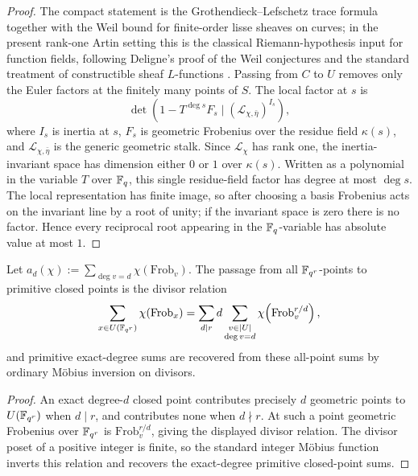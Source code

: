 \begin{proof}
The compact statement is the Grothendieck--Lefschetz trace formula together
with the Weil bound for finite-order lisse sheaves on curves; in the present
rank-one Artin setting this is the classical Riemann-hypothesis input for
function fields, following Deligne's proof of the Weil conjectures and the
standard treatment of constructible sheaf \(L\)-functions
\cite{DeligneSGA4half1977,Deligne1980WeilII,Milne1980Etale,Serre1981,Rosen2002}.
Passing from \(C\) to \(U\)
removes only the Euler factors at the finitely many points of \(S\).  The
local factor at \(s\) is
\[
\det\!\left(1-T^{\deg s}F_s\mid(\mathcal L_{\chi,\bar\eta})^{I_s}\right),
\]
where \(I_s\) is inertia at \(s\), \(F_s\) is geometric Frobenius over the
residue field \(\kappa(s)\), and \(\mathcal L_{\chi,\bar\eta}\) is the generic
geometric stalk.  Since \(\mathcal L_\chi\) has rank one, the
inertia-invariant space has dimension either \(0\) or \(1\) over
\(\kappa(s)\).  Written as a polynomial in the variable \(T\) over \(\mathbb{F}_q\),
this single residue-field factor has degree at most \(\deg s\).  The local
representation has finite image, so after choosing a basis Frobenius acts on
the invariant line by a root of unity; if the invariant space is zero there is
no factor.  Hence every reciprocal root appearing in the \(\mathbb{F}_q\)-variable
has absolute value at most \(1\).
\end{proof}

\begin{lemma}\label{lem:primitive-closed-point-inversion-convention}
Let \(a_d(\chi):=\sum_{\deg v=d}\chi(\mathrm{Frob}_v)\).  The passage from
all \(\mathbb{F}_{q^r}\)-points to primitive closed points is the divisor relation
\[
\sum_{x\in U(\mathbb{F}_{q^r})}\chi(\mathrm{Frob}_x)
=
\sum_{d\mid r}d\sum_{\substack{v\in |U|\\ \deg v=d}}
\chi\!\left(\mathrm{Frob}_v^{r/d}\right),
\]
and primitive exact-degree sums are recovered from these all-point sums by
ordinary M\"obius inversion on divisors.
\end{lemma}

\begin{proof}
An exact degree-\(d\) closed point contributes precisely \(d\) geometric
points to \(U(\mathbb{F}_{q^r})\) when \(d\mid r\), and contributes none when
\(d\nmid r\).  At such a point geometric Frobenius over \(\mathbb{F}_{q^r}\) is
\(\mathrm{Frob}_v^{r/d}\), giving the displayed divisor relation.  The
divisor poset of a positive integer is finite, so the standard integer
M\"obius function inverts this relation and recovers the exact-degree
primitive closed-point sums.
\end{proof}

